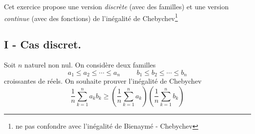 Cet exercice propose une version \emph{discrète} (avec des familles) et une version \emph{continue} (avec des fonctions) de l'inégalité de Chebychev\footnote{ne pas confondre avec l'inégalité de Bienaymé - Chebychev}
\subsection*{I - Cas discret.}
Soit $n$ naturel non nul. On considère deux familles
\begin{displaymath}
 a_1 \leq a_2 \leq \cdots \leq a_n \hspace{1cm} b_1\leq b_2\leq \cdots \leq b_n
\end{displaymath}
croissantes de réels. On souhaite prouver l'inégalité de Chebychev
\begin{displaymath}
 \frac{1}{n}\sum_{k=1}^{n}a_k b_k \geq 
\left( \frac{1}{n}\sum_{k=1}^{n}a_k\right) 
\left( \frac{1}{n}\sum_{k=1}^{n}b_k\right)
\end{displaymath}
